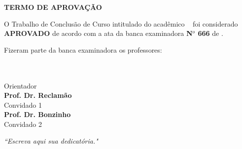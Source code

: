 \documentclass[
	12pt,				%
	openright,			%
	oneside,			%
	a4paper,			%
	chapter=TITLE,		%
	section=TITLE,		%
	subsection=TITLE,	%
	subsubsection=TITLE,%
    subsubsubsection=TITLE,%
	english,			%
    french,
    spanish,
	brazil				%
	]{utfprtex2}
\begin{document}
% 
%
\begin{folhadeaprovacao}

    \begin{center}
      \ABNTEXchapterfont\textbf{TERMO DE APROVAÇÃO}
    \end{center}
    \vfill
\begin{OnehalfSpace}\hspace{1.5cm}
O Trabalho de Conclusão de Curso intitulado \textbf{\MakeUppercase{\imprimirtitulo}} do acadêmico {\textbf\imprimirautor\ } foi considerado
\textbf{APROVADO} de acordo com a ata da banca examinadora \textbf{N$^o$ 666} de \textbf{ \the \year }.
\end{OnehalfSpace}   
 
   \vspace*{2cm}
   
   Fizeram parte da banca examinadora os professores:
   \\\\
\begin{center}
	{\textbf{\imprimirorientador} \\ Orientador \\\vspace{0,5cm}}
   {\textbf{ Prof. Dr.  Reclamão} \\  Convidado 1 \\\vspace{0,5cm}}
   {\textbf{Prof. Dr. Bonzinho} \\ Convidado 2 \\\vspace{0,5cm}}
   
\end{center}
    
    \vfill

   \begin{center}
    \end{center}
\end{folhadeaprovacao}

\begin{dedicatoria}
   \vspace*{\fill}
   \noindent
   \begin{flushright}
   \textit{“Escreva aqui sua dedicatória."}
   \end{flushright}
\end{dedicatoria}
\end{document}

